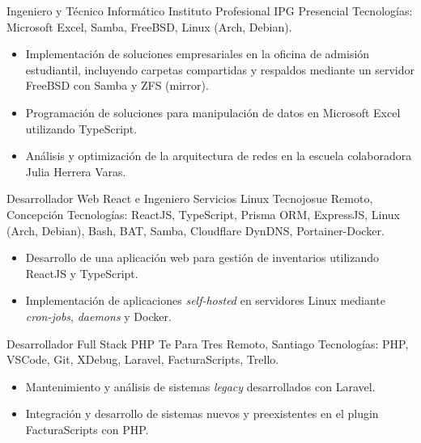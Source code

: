\documentclass[12pt,letterpaper,sans]{moderncv}
\begin{document}
{Ingeniero y Técnico Informático}
{Instituto Profesional IPG}
{\newline Presencial}
{\newline Tecnologías: Microsoft Excel, Samba, FreeBSD, Linux (Arch, Debian).}
{
  \begin{itemize}
    \item Implementación de soluciones empresariales en la oficina de admisión estudiantil, incluyendo carpetas compartidas y respaldos mediante un servidor FreeBSD con Samba y ZFS (mirror).
    \item Programación de soluciones para manipulación de datos en Microsoft Excel utilizando TypeScript.
    \item Análisis y optimización de la arquitectura de redes en la escuela colaboradora Julia Herrera Varas.
  \end{itemize}
}
\vspace{0.5em}

{Desarrollador Web React e Ingeniero Servicios Linux}
{Tecnojosue}
{\newline Remoto, Concepción}
{\newline Tecnologías: ReactJS, TypeScript, Prisma ORM, ExpressJS, Linux (Arch, Debian), Bash, BAT, Samba, Cloudflare DynDNS, Portainer-Docker.}
{
  \begin{itemize}
    \item Desarrollo de una aplicación web para gestión de inventarios utilizando ReactJS y TypeScript.
    \item Implementación de aplicaciones \textit{self-hosted} en servidores Linux mediante \textit{cron-jobs}, \textit{daemons} y Docker.
  \end{itemize}
}
\vspace{0.5em}

{Desarrollador Full Stack PHP}
{Te Para Tres}
{\newline Remoto, Santiago}
{\newline Tecnologías: PHP, VSCode, Git, XDebug, Laravel, FacturaScripts, Trello.}
{
  \begin{itemize}
    \item Mantenimiento y análisis de sistemas \textit{legacy} desarrollados con Laravel.
    \item Integración y desarrollo de sistemas nuevos y preexistentes en el plugin FacturaScripts con PHP.
  \end{itemize}
}
\vspace{0.5em}
\end{document}

